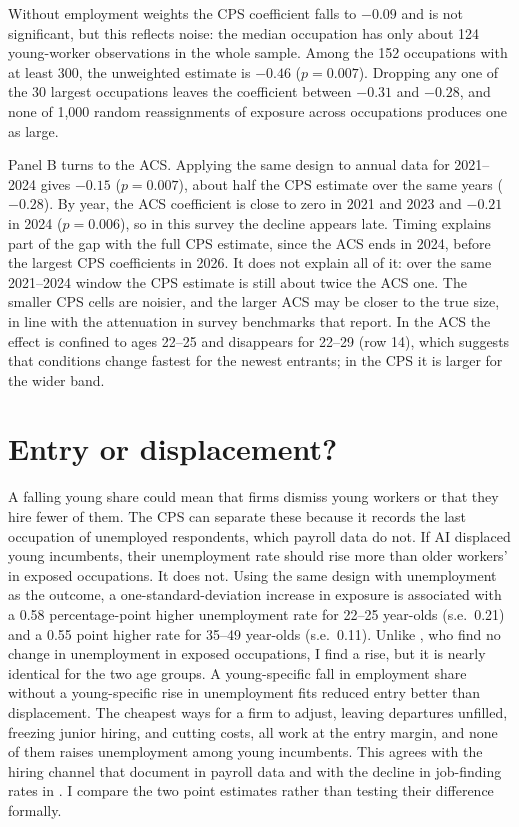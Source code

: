 \documentclass[11pt]{article}
\begin{document}
Without employment weights the CPS coefficient falls to $-0.09$ and is not significant, but this reflects noise: the median occupation has only about 124 young-worker observations in the whole sample. Among the 152 occupations with at least 300, the unweighted estimate is $-0.46$ ($p = 0.007$). Dropping any one of the 30 largest occupations leaves the coefficient between $-0.31$ and $-0.28$, and none of 1,000 random reassignments of exposure across occupations produces one as large.

Panel B turns to the ACS. Applying the same design to annual data for 2021--2024 gives $-0.15$ ($p = 0.007$), about half the CPS estimate over the same years ($-0.28$). By year, the ACS coefficient is close to zero in 2021 and 2023 and $-0.21$ in 2024 ($p = 0.006$), so in this survey the decline appears late. Timing explains part of the gap with the full CPS estimate, since the ACS ends in 2024, before the largest CPS coefficients in 2026. It does not explain all of it: over the same 2021--2024 window the CPS estimate is still about twice the ACS one. The smaller CPS cells are noisier, and the larger ACS may be closer to the true size, in line with the attenuation in survey benchmarks that \citet{brynjolfsson2026} report. In the ACS the effect is confined to ages 22--25 and disappears for 22--29 (row 14), which suggests that conditions change fastest for the newest entrants; in the CPS it is larger for the wider band.

\section{Entry or displacement?}

A falling young share could mean that firms dismiss young workers or that they hire fewer of them. The CPS can separate these because it records the last occupation of unemployed respondents, which payroll data do not. If AI displaced young incumbents, their unemployment rate should rise more than older workers' in exposed occupations. It does not. Using the same design with unemployment as the outcome, a one-standard-deviation increase in exposure is associated with a 0.58 percentage-point higher unemployment rate for 22--25 year-olds (s.e.\ 0.21) and a 0.55 point higher rate for 35--49 year-olds (s.e.\ 0.11). Unlike \citet{massenkoff2026}, who find no change in unemployment in exposed occupations, I find a rise, but it is nearly identical for the two age groups. A young-specific fall in employment share without a young-specific rise in unemployment fits reduced entry better than displacement. The cheapest ways for a firm to adjust, leaving departures unfilled, freezing junior hiring, and cutting costs, all work at the entry margin, and none of them raises unemployment among young incumbents. This agrees with the hiring channel that \citet{brynjolfsson2026} document in payroll data and with the decline in job-finding rates in \citet{massenkoff2026}. I compare the two point estimates rather than testing their difference formally.
\end{document}
